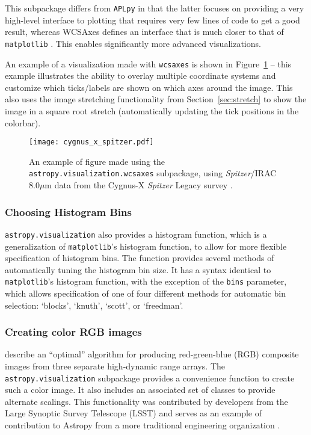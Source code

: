 \documentclass[modern]{aastex61}
\newcommand{\package}[1]{\texttt{#1}\xspace}
\newcommand{\astropy}{Astropy\xspace}
\newcommand{\sectionname}{Section\xspace}
\renewcommand{\figurename}{Figure\xspace}
\begin{document}
This subpackage differs from \package{APLpy} \citep{aplpy} in that the latter focuses on providing a very high-level interface to plotting that requires very few lines of code to get a good result, whereas WCSAxes defines an interface that is much closer to that of \package{matplotlib} \citep{matplotlib}. This enables significantly more advanced visualizations.

An example of a visualization made with \package{wcsaxes} is shown in \figurename~\ref{fig:wcsaxes} -- this example illustrates the ability to overlay multiple coordinate systems and customize which ticks/labels are shown on which axes around the image. This also uses the image stretching functionality from \sectionname~\ref{sec:stretch} to show the image in a square root stretch (automatically updating the tick positions in the colorbar).

\begin{figure}
\texttt{[image: cygnus\_x\_spitzer.pdf]}
\caption{%
An example of figure made using the \package{astropy.visualization.wcsaxes} subpackage, using \textit{Spitzer}/IRAC 8.0$\mu$m data from the Cygnus-X \textit{Spitzer} Legacy survey \citep{cygnusx}.
\label{fig:wcsaxes}
}
\end{figure}

\subsubsection{Choosing Histogram Bins}

\package{astropy.visualization} also provides a histogram function, which is a
generalization of \package{matplotlib}’s histogram function, to allow for more
flexible specification of histogram bins.  The function provides several methods
of automatically tuning the histogram bin size. It has a syntax identical to
\package{matplotlib}’s histogram function, with the exception of the \texttt{bins}
parameter, which allows specification of one of four different methods for
automatic bin selection: `blocks', `knuth', `scott', or `freedman'.

\subsubsection{Creating color RGB images}

\cite{Lupton2004} describe an ``optimal'' algorithm for producing red-green-blue (RGB) composite images from three separate high-dynamic range arrays. The \package{astropy.visualization} subpackage provides a convenience function to create such a color image.  It also includes an associated set of classes to provide alternate scalings.
This functionality was contributed by developers from the Large Synoptic Survey Telescope (LSST) and serves as an example of contribution to \astropy from a more traditional engineering organization \citep{Jennes2016}.
\end{document}
